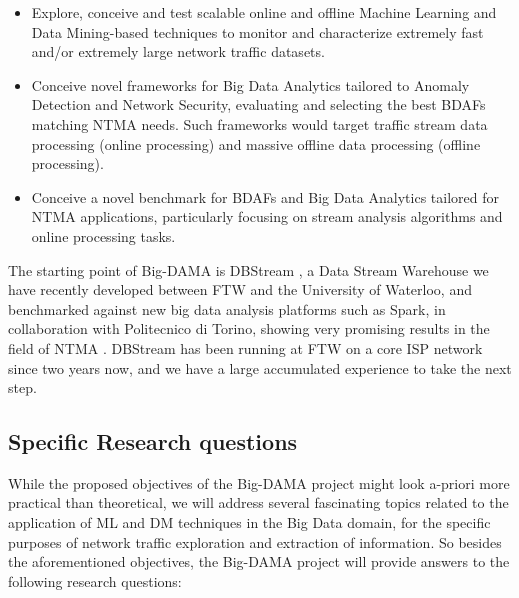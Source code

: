 \documentclass[10pt, conference, letterpaper]{IEEEtran}
\begin{document}
\begin{itemize}
\item Explore, conceive and test scalable online and offline Machine Learning and Data Mining-based techniques to monitor and characterize extremely fast and/or extremely large network traffic datasets.
\item Conceive novel frameworks for Big Data Analytics tailored to Anomaly Detection and Network Security, evaluating and selecting the best BDAFs matching NTMA needs. Such frameworks would target traffic stream data processing (online processing) and massive offline data processing (offline processing).
\item Conceive a novel benchmark for BDAFs and Big Data Analytics tailored for NTMA applications, particularly focusing on stream analysis algorithms and online processing tasks.
\end{itemize}

The starting point of Big-DAMA is DBStream \cite{baer2014}, a Data Stream Warehouse we have recently developed between FTW and the University of Waterloo, and benchmarked against new big data analysis platforms such as Spark, in collaboration with Politecnico di Torino, showing very promising results in the field of NTMA \cite{baer2014}. DBStream has been running at FTW on a core ISP network since two years now, and we have a large accumulated experience to take the next step.

\subsection{Specific Research questions}

While the proposed objectives of the Big-DAMA project might look a-priori more practical than theoretical, we will address several fascinating topics related to the application of ML and DM techniques in the Big Data domain, for the specific purposes of network traffic exploration and extraction of information. So besides the aforementioned objectives, the Big-DAMA project will provide answers to the following research questions:
\end{document}
